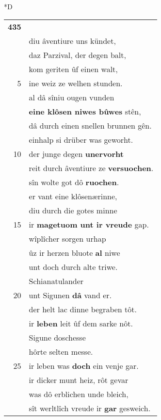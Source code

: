 \documentclass[8pt,a4paper,notitlepage]{article}
\begin{document}
\begin{table}[ht]
\begin{minipage}[t]{0.5\linewidth}
\small
\begin{center}*D
\end{center}
\begin{tabular}{rl}
\textbf{435} & \textbf{\begin{large}S\end{large}werz} niht geloubet, der sündet.\\ 
 & diu âventiure uns kündet,\\ 
 & daz Parzival, der degen balt,\\ 
 & kom geriten ûf einen walt,\\ 
5 & ine weiz ze welhen stunden.\\ 
 & al dâ sîniu ougen vunden\\ 
 & \textbf{eine klôsen niwes bûwes} stên,\\ 
 & dâ durch einen snellen brunnen gên.\\ 
 & einhalp si drüber was geworht.\\ 
10 & der junge degen \textbf{unervorht}\\ 
 & reit durch âventiure ze \textbf{versuochen}.\\ 
 & sîn wolte got dô \textbf{ruochen}.\\ 
 & er vant eine klôsenærinne,\\ 
 & diu durch die gotes minne\\ 
15 & ir \textbf{magetuom unt ir vreude} gap.\\ 
 & wîplîcher sorgen urhap\\ 
 & ûz ir herzen bluote \textbf{al} niwe\\ 
 & unt doch durch alte triwe.\\ 
 & Schianatulander\\ 
20 & unt Sigunen \textbf{dâ} vand er.\\ 
 & der helt lac dinne begraben tôt.\\ 
 & ir \textbf{leben} leit ûf dem sarke nôt.\\ 
 & Sigune doschesse\\ 
 & hôrte selten messe.\\ 
25 & ir leben was \textbf{doch} ein venje gar.\\ 
 & ir dicker munt heiz, rôt gevar\\ 
 & was dô erblichen unde bleich,\\ 
 & sît werltlîch vreude ir \textbf{gar} gesweich.\\ 

\end{tabular}
\end{minipage}
\end{table}
\end{document}
